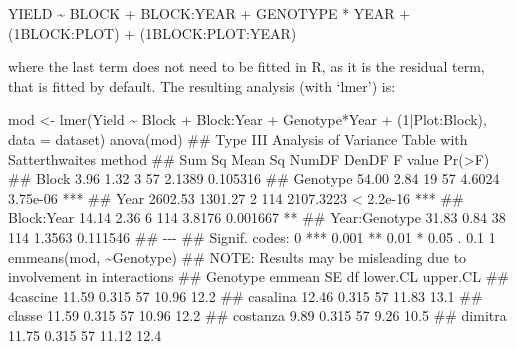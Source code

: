 \documentclass[a4paper,12pt,oneside]{book}
\newenvironment{Shaded}{\begin{snugshade}}{\end{snugshade}}
\newcommand{\DecValTok}[1]{#1}
\newcommand{\SpecialCharTok}[1]{#1}
\newcommand{\DocumentationTok}[1]{#1}
\newcommand{\OtherTok}[1]{#1}
\newcommand{\FunctionTok}[1]{#1}
\newcommand{\AttributeTok}[1]{#1}
\newcommand{\AlertTok}[1]{#1}
\newcommand{\NormalTok}[1]{#1}
\begin{document}
YIELD \textasciitilde{} BLOCK + BLOCK:YEAR + GENOTYPE * YEAR + (1\textbar BLOCK:PLOT) + (1\textbar BLOCK:PLOT:YEAR)

where the last term does not need to be fitted in R, as it is the residual term, that is fitted by default. The resulting analysis (with `lmer') is:

\begin{Shaded}
\begin{Highlighting}[]
\NormalTok{mod }\OtherTok{\textless{}{-}} \FunctionTok{lmer}\NormalTok{(Yield }\SpecialCharTok{\textasciitilde{}}\NormalTok{ Block }\SpecialCharTok{+}\NormalTok{ Block}\SpecialCharTok{:}\NormalTok{Year }\SpecialCharTok{+}\NormalTok{ Genotype}\SpecialCharTok{*}\NormalTok{Year }\SpecialCharTok{+}
\NormalTok{            (}\DecValTok{1}\SpecialCharTok{|}\NormalTok{Plot}\SpecialCharTok{:}\NormalTok{Block),}
           \AttributeTok{data =}\NormalTok{ dataset)}
\FunctionTok{anova}\NormalTok{(mod)}
\DocumentationTok{\#\# Type III Analysis of Variance Table with Satterthwaite\textquotesingle{}s method}
\DocumentationTok{\#\#                Sum Sq Mean Sq NumDF DenDF   F value    Pr(\textgreater{}F)    }
\DocumentationTok{\#\# Block            3.96    1.32     3    57    2.1389  0.105316    }
\DocumentationTok{\#\# Genotype        54.00    2.84    19    57    4.6024  3.75e{-}06 ***}
\DocumentationTok{\#\# Year          2602.53 1301.27     2   114 2107.3223 \textless{} 2.2e{-}16 ***}
\DocumentationTok{\#\# Block:Year      14.14    2.36     6   114    3.8176  0.001667 ** }
\DocumentationTok{\#\# Year:Genotype   31.83    0.84    38   114    1.3563  0.111546    }
\DocumentationTok{\#\# {-}{-}{-}}
\DocumentationTok{\#\# Signif. codes:  0 \textquotesingle{}***\textquotesingle{} 0.001 \textquotesingle{}**\textquotesingle{} 0.01 \textquotesingle{}*\textquotesingle{} 0.05 \textquotesingle{}.\textquotesingle{} 0.1 \textquotesingle{} \textquotesingle{} 1}
\FunctionTok{emmeans}\NormalTok{(mod, }\SpecialCharTok{\textasciitilde{}}\NormalTok{Genotype)}
\DocumentationTok{\#\# }\AlertTok{NOTE}\DocumentationTok{: Results may be misleading due to involvement in interactions}
\DocumentationTok{\#\#  Genotype          emmean    SE df lower.CL upper.CL}
\DocumentationTok{\#\#  4cascine           11.59 0.315 57    10.96     12.2}
\DocumentationTok{\#\#  casalina           12.46 0.315 57    11.83     13.1}
\DocumentationTok{\#\#  classe             11.59 0.315 57    10.96     12.2}
\DocumentationTok{\#\#  costanza            9.89 0.315 57     9.26     10.5}
\DocumentationTok{\#\#  dimitra            11.75 0.315 57    11.12     12.4}

\end{Highlighting}
\end{Shaded}
\end{document}

